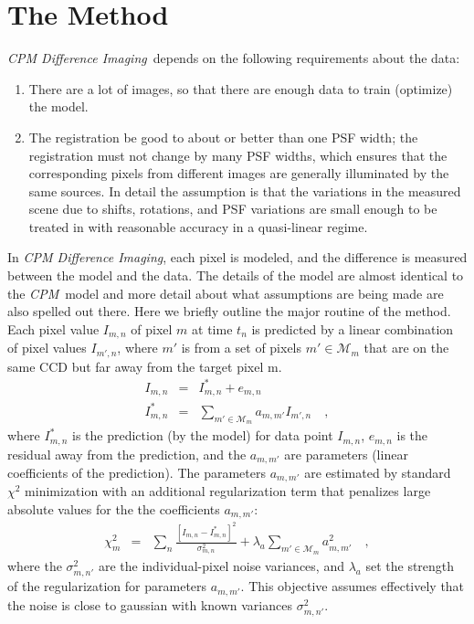 \documentclass[12pt, preprint]{aastex}
\newcommand{\project}[1]{\textsl{#1}}
\newcommand{\cpm}{\project{CPM}}
\newcommand{\cpmdiff}{\project{CPM Difference Imaging}}
\newcommand{\set}[1]{\mathcal{#1}}
\begin{document}
\section{The Method} \label{method}
\cpmdiff\ depends on the following requirements about the data:
\begin{enumerate}
\item
There are a lot of images, so that there are enough data to train (optimize) the model.
\item
The registration be good to about or better than one PSF width; the registration must not change by many PSF widths, which ensures that the corresponding pixels from different images are generally illuminated by the same sources. 
In detail the assumption is that the variations in the measured scene due to shifts, rotations, and PSF variations are small enough to be treated in with reasonable accuracy in a quasi-linear regime.
\end{enumerate}

In \cpmdiff, each pixel is modeled, and the difference is measured between the model and the data. 
The details of the model are almost identical to the \cpm\ model \citep{cpm} and more detail about what assumptions are being made are also spelled out there. 
Here we briefly outline the major routine of the method. Each pixel value $I_{m,n}$ of pixel $m$ at time $t_n$ is predicted by a linear combination of pixel values $I_{m',n}$, where $m'$ is from a set of pixels $m'\in\set{M}_m$ that are on the same CCD but far away from the target pixel m.
\begin{eqnarray}
I_{m,n}         &=& I^{\ast}_{m,n} + e_{m,n}
\\
I^{\ast}_{m,n}  &=& \sum_{m'\in\set{M}_m} a_{m,m'}I_{m',n} 
\quad,
\end{eqnarray}
where $I^{\ast}_{m,n}$ is the prediction (by the model) for data point $I_{m,n}$, $e_{m,n}$ is the residual away from the prediction, and the $a_{m,m'}$ are parameters (linear coefficients of the prediction).
The parameters $a_{m,m'}$ are estimated by standard $\chi^2$ minimization with an additional regularization term that penalizes large absolute values for the the coefficients $a_{m,m'}$:
\begin{eqnarray}
\chi^2_{m}    &=& \sum_{n} \frac{[I_{m,n} - I^{\ast}_{m,n}]^2}{\sigma^2_{m,n}}+ \lambda_{a}\sum_{m'\in\set{M}_m}a_{m,m'}^2 
\quad,
\end{eqnarray}
where the $\sigma^2_{m,n'}$ are the individual-pixel noise variances, and $\lambda_{a}$ set the strength of the regularization for parameters $a_{m,m'}$.
This objective assumes effectively that the noise is close to gaussian with known variances $\sigma^2_{m,n'}$.
\end{document}
